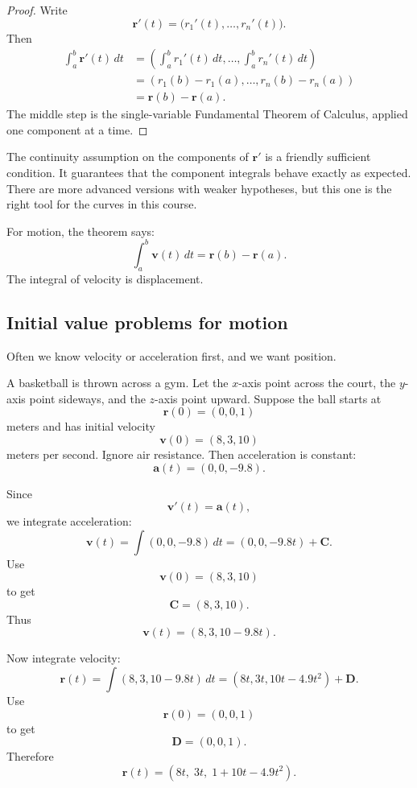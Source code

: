 \begin{proof}
Write
\[
    \mathbf r'(t)=\bigl(r_1'(t),\ldots,r_n'(t)\bigr).
\]
Then
\[
\begin{aligned}
\int_a^b \mathbf r'(t)\,dt
&=
\left(
    \int_a^b r_1'(t)\,dt,\ldots,\int_a^b r_n'(t)\,dt
\right)\\
&=
\left(
    r_1(b)-r_1(a),\ldots,r_n(b)-r_n(a)
\right)\\
&=
\mathbf r(b)-\mathbf r(a).
\end{aligned}
\]
The middle step is the single-variable Fundamental Theorem of Calculus, applied one
component at a time.
\end{proof}

The continuity assumption on the components of \(\mathbf r'\) is a friendly sufficient
condition.  It guarantees that the component integrals behave exactly as expected.  There
are more advanced versions with weaker hypotheses, but this one is the right tool for
the curves in this course.

For motion, the theorem says:
\[
\boxed{
    \int_a^b \mathbf v(t)\,dt
    =
    \mathbf r(b)-\mathbf r(a).
}
\]
The integral of velocity is displacement.

\subsection{Initial value problems for motion}

Often we know velocity or acceleration first, and we want position.

A basketball is thrown across a gym.  Let the \(x\)-axis point across the court, the
\(y\)-axis point sideways, and the \(z\)-axis point upward.  Suppose the ball starts at
\[
    \mathbf r(0)=(0,0,1)
\]
meters and has initial velocity
\[
    \mathbf v(0)=(8,3,10)
\]
meters per second.  Ignore air resistance.  Then acceleration is constant:
\[
    \mathbf a(t)=(0,0,-9.8).
\]

Since
\[
    \mathbf v'(t)=\mathbf a(t),
\]
we integrate acceleration:
\[
    \mathbf v(t)=\int (0,0,-9.8)\,dt
    =
    (0,0,-9.8t)+\mathbf C.
\]
Use
\[
    \mathbf v(0)=(8,3,10)
\]
to get
\[
    \mathbf C=(8,3,10).
\]
Thus
\[
    \mathbf v(t)=(8,3,10-9.8t).
\]

Now integrate velocity:
\[
    \mathbf r(t)=\int (8,3,10-9.8t)\,dt
    =
    (8t,3t,10t-4.9t^2)+\mathbf D.
\]
Use
\[
    \mathbf r(0)=(0,0,1)
\]
to get
\[
    \mathbf D=(0,0,1).
\]
Therefore
\[
\boxed{
    \mathbf r(t)=(8t,\;3t,\;1+10t-4.9t^2).
}
\]

